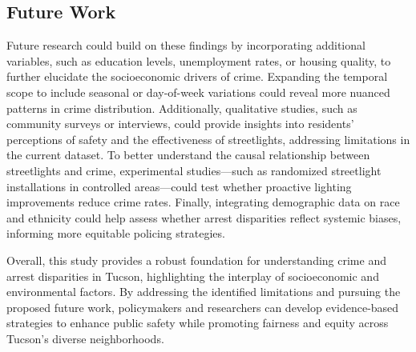 \documentclass{report}
\begin{document}
\subsection{Future Work}
\par Future research could build on these findings by incorporating additional variables, such as education levels, unemployment rates, or housing quality, to further elucidate the socioeconomic drivers of crime. Expanding the temporal scope to include seasonal or day-of-week variations could reveal more nuanced patterns in crime distribution. Additionally, qualitative studies, such as community surveys or interviews, could provide insights into residents' perceptions of safety and the effectiveness of streetlights, addressing limitations in the current dataset. To better understand the causal relationship between streetlights and crime, experimental studies—such as randomized streetlight installations in controlled areas—could test whether proactive lighting improvements reduce crime rates. Finally, integrating demographic data on race and ethnicity could help assess whether arrest disparities reflect systemic biases, informing more equitable policing strategies.

Overall, this study provides a robust foundation for understanding crime and arrest disparities in Tucson, highlighting the interplay of socioeconomic and environmental factors. By addressing the identified limitations and pursuing the proposed future work, policymakers and researchers can develop evidence-based strategies to enhance public safety while promoting fairness and equity across Tucson's diverse neighborhoods.

\newpage
\nocite{*}
\printbibliography[heading=bibintoc]
\end{document}
